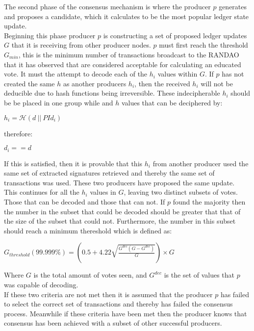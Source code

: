 The second phase of the consensus mechanism is where the producer $p$ generates and proposes a candidate, which it calculates to be the most popular ledger state update. \\


Beginning this phase producer $p$ is constructing a set of proposed ledger updates $G$ that it is receiving from other producer nodes. $p$ must first reach the threshold $G_{min}$, this is the minimum number of transactions broadcast to the RANDAO that it has observed that are considered acceptable for calculating an educated vote. It must the attempt to decode each of the $h_i$ values within $G$. If $p$ has not created the same $h$ as another producers $h_i$, then the received $h_i$ will not be deducible due to hash functions being irreversible. These indecipherable $h_i$ should be be placed in one group while and $h$ values that can be deciphered by: 

\begin{center} 
$h_i = \mathcal{H}(d~||~PId_i)$
\end{center} 

therefore:

\begin{center} 
$d_i == d$
\end{center} 

If this is satisfied, then it is provable that this $h_i$ from another producer used the same set of extracted signatures retrieved and thereby the same set of transactions was used. These two producers have proposed the same update. \\

This continues for all the $h_i$ values in $G$, leaving two distinct subsets of votes. Those that can be decoded and those that can not. If $p$ found the majority then the number in the subset that could be decoded should be greater that that of the size of the subset that could not. Furthermore, the number in this subset should reach a minimum thereshold which is defined as:

\begin{center} 
$G_{threshold}(99.999\%) = \left( 0.5 + 4.22\sqrt{\frac{G^{dec}(G-G^{dec})}{G}}\right) \times G$
\end{center} 

Where $G$ is the total amount of votes seen, and $G^{dec}$ is the set of values that $p$ was capable of decoding. \\

If these two criteria are not met then it is assumed that the producer $p$ has failed to select the correct set of transactions and thereby has failed the consensus process. Meanwhile if these criteria have been met then the producer knows that consensus has been achieved with a subset of other successful producers. \\

